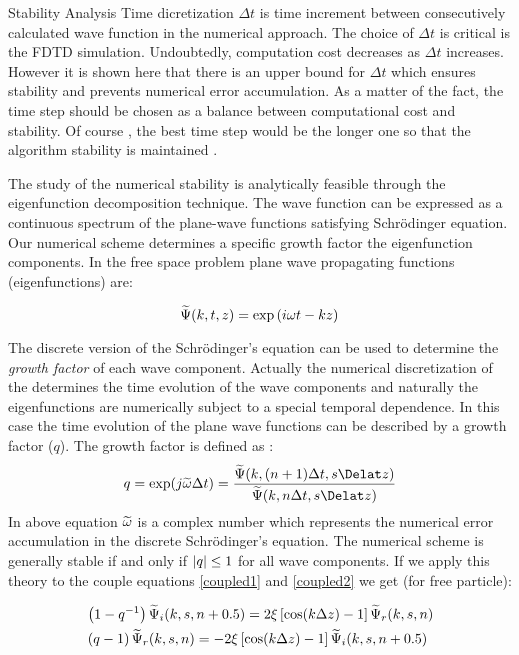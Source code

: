 \begin{homeworkProblem}
\begin{homeworkSection}{Stability Analysis}
Time dicretization $\Delta t$ is time increment between consecutively calculated wave function in the numerical approach. The choice of $\Delta t$ is critical is the FDTD simulation. Undoubtedly, computation cost decreases as $\Delta t$ increases. However it is shown here that there is an upper bound for $\Delta t$ which ensures stability and prevents numerical error accumulation. As a matter of the fact, the time step should be chosen as a balance between computational cost and stability. Of course , the best time step would be the longer one so that the algorithm stability is maintained \cite{taflove}. 

The study of the numerical stability is analytically feasible through the eigenfunction decomposition technique. The wave function can be expressed as a continuous spectrum of the plane-wave functions satisfying Schr\"odinger equation. Our numerical scheme determines a specific growth factor the eigenfunction components. In the free space problem  plane wave propagating functions (eigenfunctions) are:


\begin{equation}
\widetilde{\Psi}(k,t,z)=\exp\left(i\omega t-kz\right)
\end{equation}     

The discrete version of the Schr\"odinger's equation can be used to determine the \textit{growth factor} of each wave component. Actually the numerical discretization of the determines the time evolution of the wave components and naturally the eigenfunctions are numerically subject to a special temporal dependence. In this case the time evolution of the plane wave functions can be described by a growth factor ($q$). The growth factor is defined as :
\begin{equation}
q=\exp(j\T{\omega}\Delta t)=\frac{\T{\Psi}(k,(n+1)\Delta t,s\Delat z)}{\T{\Psi}(k,n\Delta t,s\Delat z)}
\end{equation} 
In above equation $\widetilde{\omega}$ is a complex number which represents the numerical error accumulation in the discrete Schr\"odinger's equation. The numerical scheme is generally stable if and only if $\lvert q\rvert\leq 1$ for all wave components. If we apply this theory to the couple equations \eqref{coupled1} and \eqref{coupled2} we get (for free particle):

\begin{align}
&\left(1-q^{-1}\right)\widetilde{\Psi}_i(k,s,n+0.5) =2\xi\left[\cos(k\Delta z)-1\right]\widetilde{\Psi}_r(k,s,n)\\
&\left(q-1\right)\widetilde{\Psi}_r(k,s,n)=-2\xi\left[\cos(k\Delta z)-1\right]\widetilde{\Psi}_i(k,s,n+0.5) 
\end{align}
 

\end{homeworkSection}
\end{homeworkProblem}
